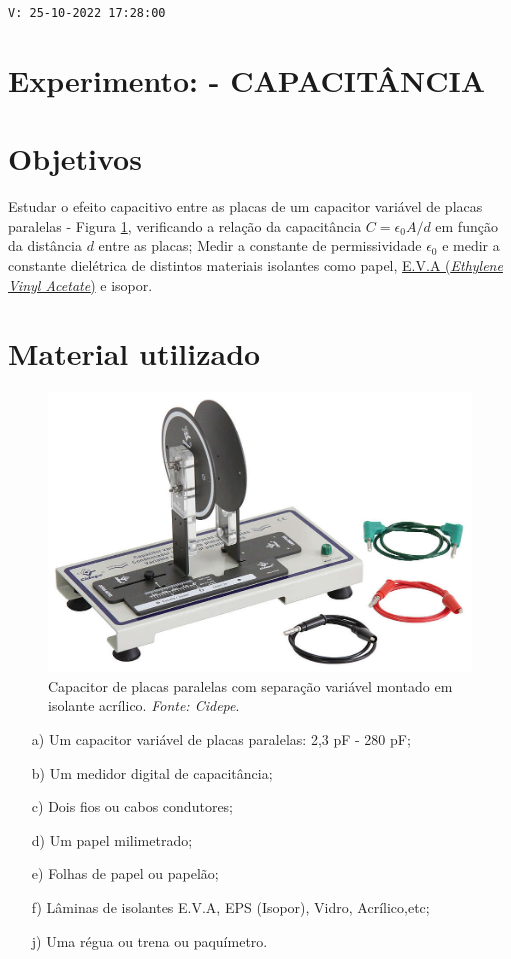 \noindent \texttt{V: 25-10-2022 17:28:00}
\section*{Experimento: - CAPACITÂNCIA}
	\section{Objetivos}
	
	Estudar o efeito capacitivo entre as placas de um capacitor variável de placas paralelas - Figura \ref{fig:cidepe-capacitor}, verificando a relação da capacitância $C=\epsilon_{0} A/d$ em função da distância $d$ entre as placas; Medir a constante de permissividade ${\epsilon}_{0}$ e medir a constante dielétrica de distintos materiais isolantes como papel, \href{https://pt.wikipedia.org/wiki/Espuma_vin\%C3\%ADlica_acetinada}{ E.V.A (\textit{Ethylene Vinyl Acetate})} e isopor.	
	\section{Material utilizado}
	
\begin{figure}
    \centering
    \includegraphics[width=.36\textwidth]{img/cidepe-capacitor.jpg}
    \caption{Capacitor de placas paralelas com separação variável montado em isolante acrílico. \textit{Fonte: Cidepe}.}
    \label{fig:cidepe-capacitor}
\end{figure}
	
	\begin{itemize}
		\item[a)] Um capacitor variável de placas paralelas: 2,3 pF - 280 pF;
		\item[b)] Um medidor digital de capacitância;
		\item[c)] Dois fios ou cabos condutores;
		\item[d)] Um papel milimetrado;
		\item[e)] Folhas de papel ou papelão;
		\item[f)] Lâminas de isolantes E.V.A, EPS (Isopor), Vidro, Acrílico,etc;
		\item[j)] Uma régua ou trena ou paquímetro.
		
	\end{itemize}
	
